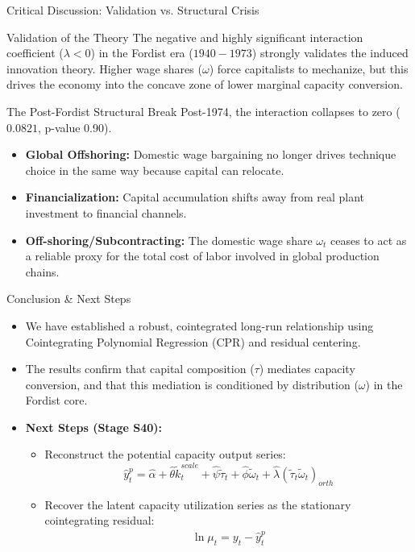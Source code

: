 \documentclass[10pt]{beamer}
\begin{document}
\begin{frame}{Critical Discussion: Validation vs. Structural Crisis}
  \begin{block}{Validation of the Theory}
    The negative and highly significant interaction coefficient ($\lambda < 0$) in the Fordist era ($1940-1973$) strongly validates the induced innovation theory. Higher wage shares ($\omega$) force capitalists to mechanize, but this drives the economy into the concave zone of lower marginal capacity conversion.
  \end{block}
  \begin{block}{The Post-Fordist Structural Break}
    Post-1974, the interaction collapses to zero ($0.0821$, p-value 0.90).
    \begin{itemize}
      \item \textbf{Global Offshoring:} Domestic wage bargaining no longer drives technique choice in the same way because capital can relocate.
      \item \textbf{Financialization:} Capital accumulation shifts away from real plant investment to financial channels.
      \item \textbf{Off-shoring/Subcontracting:} The domestic wage share $\omega_t$ ceases to act as a reliable proxy for the total cost of labor involved in global production chains.
    \end{itemize}
  \end{block}
\end{frame}

\begin{frame}{Conclusion \& Next Steps}
  \begin{itemize}
    \item We have established a robust, cointegrated long-run relationship using Cointegrating Polynomial Regression (CPR) and residual centering.
    \item The results confirm that capital composition ($\tau$) mediates capacity conversion, and that this mediation is conditioned by distribution ($\omega$) in the Fordist core.
    \item \textbf{Next Steps (Stage S40):}
      \begin{itemize}
        \item Reconstruct the potential capacity output series:
          $$\hat{y}_t^p = \hat{\alpha} + \hat{\theta} \tilde{k}^{scale}_t + \hat{\psi} \tilde{\tau}_t + \hat{\phi} \tilde{\omega}_t + \hat{\lambda} (\tilde{\tau}_t \tilde{\omega}_t)_{orth}$$
        \item Recover the latent capacity utilization series as the stationary cointegrating residual:
          $$\widehat{\ln \mu_t} = y_t - \hat{y}_t^p$$
      \end{itemize}
  \end{itemize}
\end{frame}
\end{document}
